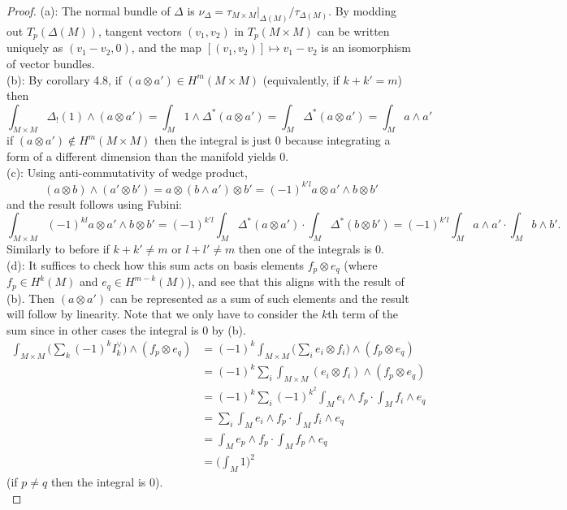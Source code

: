 \documentclass{amsart}
\begin{document}
	\begin{proof}
		(a): The normal bundle of $\Delta$ is $\nu_{\Delta} = \tau_{M\times M}|_{\Delta(M)}/\tau_{\Delta(M)}$. By modding out $T_p(\Delta(M))$, tangent vectors $(v_1,v_2)$ in $T_p(M\times M)$ can be written uniquely as $(v_1-v_2,0)$, and the map $[(v_1,v_2)]\mapsto v_1-v_2$ is an isomorphism of vector bundles.\\
		
		(b): By corollary 4.8, if $(a\otimes a')\in H^{m}(M\times M)$ (equivalently, if $k+k'=m$) then
		$$
		\int_{M\times M} \Delta_!(1) \wedge (a\otimes a') = \int_M 1\wedge \Delta^*(a\otimes a') = \int_M\Delta^*(a\otimes a') = \int_M a\wedge a'
		$$
		if $(a\otimes a')\not\in H^m(M\times M)$ then the integral is just 0 because integrating a form of a different dimension than the manifold yields 0.\\
		
		(c): Using anti-commutativity of wedge product,
		$$(a\otimes b) \wedge (a'\otimes b') = a\otimes (b \wedge a') \otimes b' = (-1)^{k'l}a\otimes a' \wedge b\otimes b'$$
		and the result follows using Fubini:
		$$
		\int_{M\times M} (-1)^{kl}a\otimes a' \wedge b\otimes b' = (-1)^{k'l} \int_M \Delta^*(a\otimes a') \cdot \int_M \Delta^*(b\otimes b') = (-1)^{k'l} \int_M a\wedge a' \cdot \int_M b\wedge b'.
		$$
		Similarly to before if $k+k'\neq m$ or $l+l'\neq m$ then one of the integrals is 0.\\
		
		(d): It suffices to check how this sum acts on basis elements $f_p\otimes e_q$ (where $f_p\in H^{k}(M)$ and $e_q\in H^{m-k}(M)$), and see that this aligns with the result of (b). Then $(a\otimes a')$ can be represented as a sum of such elements and the result will follow by linearity. Note that we only have to consider the $k$th term of the sum since in other cases the integral is 0 by (b).
		\begin{align*}
			\int_{M\times M} \bigg(\sum_k (-1)^k I_k^{\vee}\bigg) \wedge (f_p\otimes e_q) &= (-1)^k \int_{M\times M} \bigg(\sum_i e_i\otimes f_i\bigg) \wedge (f_p\otimes e_q)\\
			&= (-1)^k \sum_i \int_{M\times M} (e_i\otimes f_i) \wedge (f_p\otimes e_q)\\
			&= (-1)^k \sum_i (-1)^{k^2} \int_M e_i\wedge f_p \cdot \int_M f_i\wedge e_q\\
			&= \sum_i  \int_M e_i\wedge f_p \cdot \int_M f_i\wedge e_q\\
			&= \int_M e_p\wedge f_p \cdot \int_M f_p \wedge e_q\\
			&= \bigg(\int_M 1\bigg)^2
		\end{align*}
		(if $p\neq q$ then the integral is 0).\\
		
	\end{proof}
	
\end{document}

